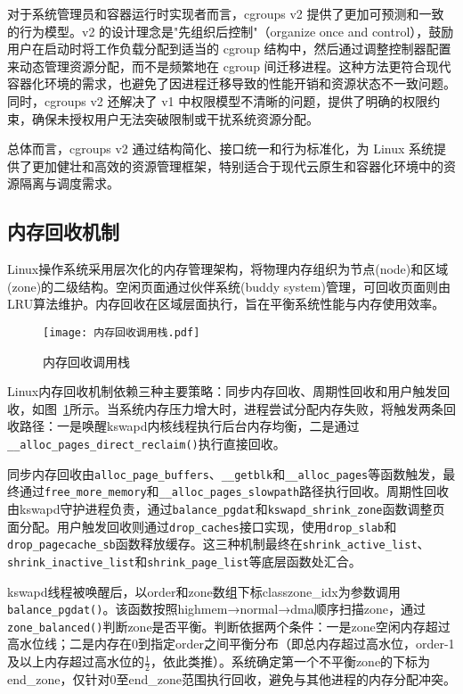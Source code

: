 对于系统管理员和容器运行时实现者而言，cgroups v2 提供了更加可预测和一致的行为模型。v2 的设计理念是"先组织后控制"（organize once and control），鼓励用户在启动时将工作负载分配到适当的 cgroup 结构中，然后通过调整控制器配置来动态管理资源分配，而不是频繁地在 cgroup 间迁移进程。这种方法更符合现代容器化环境的需求，也避免了因进程迁移导致的性能开销和资源状态不一致问题。同时，cgroups v2 还解决了 v1 中权限模型不清晰的问题，提供了明确的权限约束，确保未授权用户无法突破限制或干扰系统资源分配。

总体而言，cgroups v2 通过结构简化、接口统一和行为标准化，为 Linux 系统提供了更加健壮和高效的资源管理框架，特别适合于现代云原生和容器化环境中的资源隔离与调度需求。

\subsection{内存回收机制}
\label{sec:Linux内存回收机制}

Linux操作系统采用层次化的内存管理架构，将物理内存组织为节点(node)和区域(zone)的二级结构。空闲页面通过伙伴系统(buddy system)管理，可回收页面则由LRU算法维护。内存回收在区域层面执行，旨在平衡系统性能与内存使用效率。

\begin{figure}[h]
    \centering
    \texttt{[image: 内存回收调用栈.pdf]}
    \caption{内存回收调用栈}
    \label{fig:memory_reclaim_callgraph}
\end{figure}

Linux内存回收机制依赖三种主要策略：同步内存回收、周期性回收和用户触发回收，如图~\ref{fig:memory_reclaim_callgraph}所示。当系统内存压力增大时，进程尝试分配内存失败，将触发两条回收路径：一是唤醒kswapd内核线程执行后台内存均衡，二是通过\texttt{\_\_alloc\_pages\_direct\_reclaim()}执行直接回收。

同步内存回收由\texttt{alloc\_page\_buffers}、\texttt{\_\_getblk}和\texttt{\_\_alloc\_pages}等函数触发，最终通过\texttt{free\_more\_memory}和\texttt{\_\_alloc\_pages\_slowpath}路径执行回收。周期性回收由kswapd守护进程负责，通过\texttt{balance\_pgdat}和\texttt{kswapd\_shrink\_zone}函数调整页面分配。用户触发回收则通过\texttt{drop\_caches}接口实现，使用\texttt{drop\_slab}和\texttt{drop\_pagecache\_sb}函数释放缓存。这三种机制最终在\texttt{shrink\_active\_list}、\texttt{shrink\_inactive\_list}和\texttt{shrink\_page\_list}等底层函数处汇合。

kswapd线程被唤醒后，以order和zone数组下标classzone\_idx为参数调用\texttt{balance\_pgdat()}。该函数按照highmem→normal→dma顺序扫描zone，通过\texttt{zone\_balanced()}判断zone是否平衡。判断依据两个条件：一是zone空闲内存超过高水位线；二是内存在0到指定order之间平衡分布（即总内存超过高水位，order-1及以上内存超过高水位的$\frac{1}{2}$，依此类推）。系统确定第一个不平衡zone的下标为end\_zone，仅针对0至end\_zone范围执行回收，避免与其他进程的内存分配冲突。

